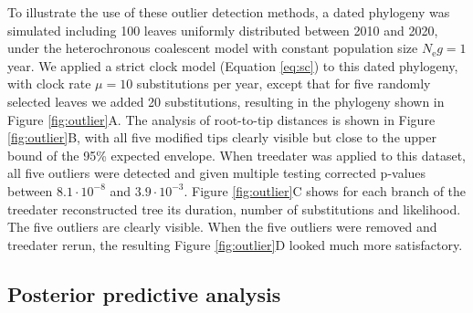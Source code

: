 \documentclass{article}
\begin{document}
To illustrate the use of these outlier detection methods,  
a dated phylogeny was simulated including 100 leaves uniformly distributed between 2010 and 2020, 
under the heterochronous coalescent model \citep{Drummond2002}
with constant population size $N_\mathrm{e}g=1$ year. 
We applied a strict clock model (Equation \ref{eq:sc}) to this dated phylogeny,
with clock rate $\mu=10$ substitutions per year, except that for five randomly selected leaves
we added 20 substitutions, resulting in the phylogeny shown in Figure \ref{fig:outlier}A.
The analysis of root-to-tip distances is shown in Figure \ref{fig:outlier}B, with all five modified tips
clearly visible but close to the upper bound of the 95\% expected envelope. 
When treedater was applied to this dataset, all five outliers were detected and given multiple testing corrected
p-values between $8.1\cdot10^{-8}$ and $3.9\cdot10^{-3}$. Figure \ref{fig:outlier}C shows for each
branch of the treedater reconstructed tree its duration, number of substitutions and likelihood.
The five outliers are clearly visible. When the five outliers were removed and treedater rerun,
the resulting Figure \ref{fig:outlier}D looked much more satisfactory.

\subsection*{Posterior predictive analysis}
\end{document}
